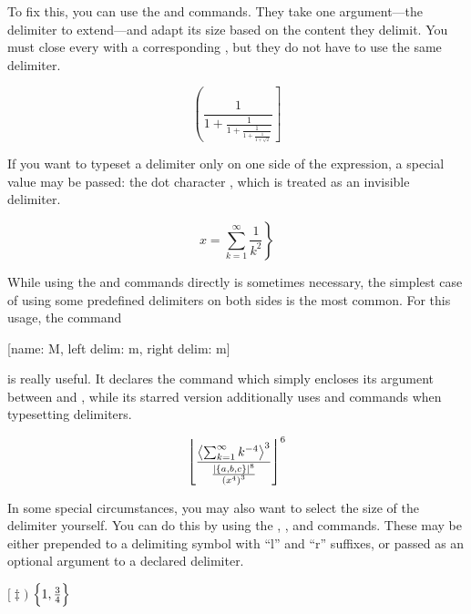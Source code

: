 To fix this, you can use the  and  commands. They take one
argument---the delimiter to extend---and adapt its size based on the content
they delimit. You must close every  with a corresponding ,
but they do not have to use the same delimiter.
\begin{chktexignore}
\begin{example}
\[
  \left(
    \frac{1}{1 +
      \frac{1}{1 +
        \frac{1}{1 +
          \frac{1}{1 +
            \sqrt{2}}}}}
  \right]
\]
\end{example}
\end{chktexignore}
If you want to typeset a delimiter only on one side of the expression, a special
value may be passed: the dot character , which is treated as an invisible
delimiter.
\begin{example}
\[
  x = \left.
    \sum_{k=1}^{\infty}
      \frac{1}{k^2}
  \right\}
\]
\end{example}

While using the  and  commands directly is sometimes
necessary, the simplest case of using some predefined delimiters on both sides
is the most common. For this usage, the command
\begin{lscommand}
  [name: M, left delim: m, right delim: m]
\end{lscommand}
is really useful. It declares the  command which simply encloses its
argument between  and , while its starred
version additionally uses  and  commands when typesetting
delimiters.
\begin{chktexignore}
\begin{example}[vertical_mode, examplewidth=0.8\linewidth]
\DeclarePairedDelimiter{\set}{\{}{\}}
\DeclarePairedDelimiter{\size}{\lvert}{\rvert}
\DeclarePairedDelimiter{\mean}{\langle}{\rangle}
\DeclarePairedDelimiter{\floor}{\lfloor}{\rfloor}
\DeclarePairedDelimiter{\group}{(}{)}
\[
  \floor*{
    \frac
    {\mean*{\sum_{k=1}^{\infty} k^{-4}}^3}
    {\frac{\size*{\set{a,b,c}}^8}{\group*{x^4}^3}}
  }^6
\]
\end{example}
\end{chktexignore}

In some special circumstances, you may also want to select the size of the
delimiter yourself. You can do this by using the , ,
 and  commands. These may be either prepended to a
delimiting symbol with \enquote{l} and \enquote{r} suffixes, or passed as an
optional argument to a declared delimiter.
\begin{chktexignore}
  \begin{example}
\DeclarePairedDelimiter{%
  \set}{\{}{\}}
\( \bigl[ \ddagger \Biggr) \)
\quad %
\( \set[\Big]{1,\frac{3}{4}} \)
\end{example}
\end{chktexignore}


